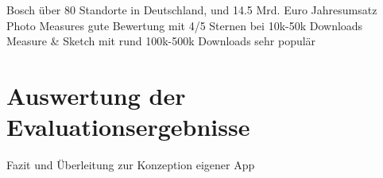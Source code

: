 Bosch über 80 Standorte in Deutschland, und 14.5 Mrd. Euro Jahresumsatz \\
Photo Measures gute Bewertung mit 4/5 Sternen bei 10k-50k Downloads \\
Measure \& Sketch mit rund 100k-500k Downloads sehr populär \\





\section{Auswertung der Evaluationsergebnisse}
Fazit und Überleitung zur Konzeption eigener App
